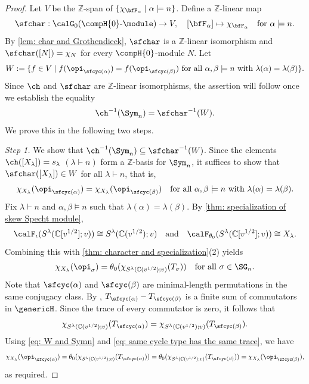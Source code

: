 \documentclass[12pt, reqno]{amsart}
\theoremstyle{plain}
\theoremstyle{definition}
\numberwithin{equation}{section}
\numberwithin{figure}{section}
\numberwithin{table}{section}
\def\Z{\mathbb Z}
\def\C{\mathbb C}
\begin{document}
\begin{proof} 
Let $V$ be the $\Z$-span of $\{ \chi_{\bfF_\alpha} \mid \alpha \models n\}$.
Define a $\Z$-linear map
\[
\sfchar:
\calG_0(\compH{0}\text{-}\module)
\to
V,
\quad [\bfF_\alpha] \mapsto \chi_{\bfF_\alpha} 
\quad \text{for $\alpha \models n$}.
\]
By \cref{lem: char and Grothendieck}, $\sfchar$ is a $\Z$-linear isomorphism and $\sfchar([N]) = \chi_N$ for every $\compH{0}$-module $N$.
Let
\[
W := \{f \in V \mid f(\opi_{\sfcyc(\alpha)}) = f(\opi_{\sfcyc(\beta)}) \text{ for all $\alpha, \beta \models n$ with $\lambda(\alpha) = \lambda(\beta)$}\}.
\]
Since $\ch$ and $\sfchar$ are $\Z$-linear isomorphisms, the assertion will follow once we establish the equality
\begin{align}\label{eq: ch inv and char inv}
\ch^{-1}(\Sym_n) = \sfchar^{-1}(W).
\end{align}
We prove this in the following two steps.
\smallskip

{\it Step 1.} We show that $\ch^{-1}(\Sym_n) \subseteq \sfchar^{-1}(W)$.
Since the elements $\ch([X_\lambda]) = s_\lambda$ $(\lambda \vdash n)$ form a $\Z$-basis for $\Sym_n$, it suffices to show that $\sfchar([X_\lambda]) \in W$ for all $\lambda \vdash n$, that is,
\[
\chi_{X_\lambda}(\opi_{\sfcyc(\alpha)}) = \chi_{X_\lambda}(\opi_{\sfcyc(\beta)})
\quad \text{for all $\alpha, \beta \models n$ with $\lambda(\alpha) = \lambda(\beta)$}.
\]
Fix $\lambda \vdash n$ and $\alpha, \beta \models n$ such that $\lambda(\alpha) = \lambda(\beta)$.
By \cref{thm: specialization of skew Specht module},
\[
\calF_{\iota}(S^{\lambda}(\C[v^{1/2}]; v)) \cong S^{\lambda}(\C(v^{1/2}); v) \quad\text{and}\quad
\calF_{\theta_0}(S^{\lambda}(\C[v^{1/2}]; v)) \cong X_{\lambda}.
\]
Combining this with \cref{thm: character and specialization}(2) yields
\begin{align}\label{eq: W and Symn}
\chi_{X_{\lambda}}(\opi_\sigma) 
= \theta_0(\chi_{S^{\lambda}(\C(v^{1/2});v)}(T_\sigma)) \quad\text{for all $\sigma \in \SG_n$}.
\end{align}
Note that $\sfcyc(\alpha)$ and $\sfcyc(\beta)$ are minimal-length permutations in the same conjugacy class.
By \cite[(1) on p.~261]{00GP}, $T_{\sfcyc(\alpha)}-T_{\sfcyc(\beta)}$ is a finite sum of commutators in $\genericH$.
Since the trace of every commutator is zero, it follows that
\begin{align}\label{eq: same cycle type has the same trace}
\chi_{S^{\lambda}(\C(v^{1/2});v)}(T_{\sfcyc(\alpha)}) 
= \chi_{S^{\lambda}(\C(v^{1/2});v)}(T_{\sfcyc(\beta)}).
\end{align}
Using \cref{eq: W and Symn} and
\cref{eq: same cycle type has the same trace}, we have
\begin{align*}
\chi_{X_{\lambda}}(\opi_{\sfcyc(\alpha)}) 
= \theta_0(\chi_{S^{\lambda}(\C(v^{1/2});v)}(T_{\sfcyc(
\alpha)}))
= \theta_0(\chi_{S^{\lambda}(\C(v^{1/2});v)}(T_{\sfcyc(
\beta)}))
= \chi_{X_\lambda}(\opi_{\sfcyc(\beta)}),
\end{align*}
as required.
\smallskip


\end{proof}
\end{document}
